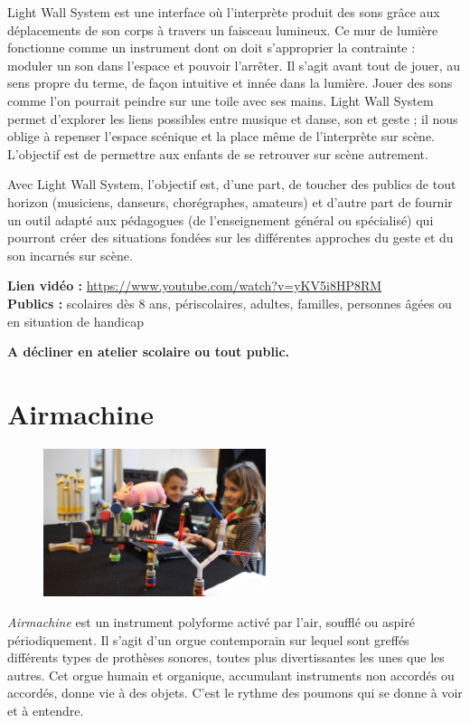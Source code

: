 \documentclass[fontsize=12pt]{scrartcl} %
\numberwithin{equation}{section} %
\numberwithin{table}{section} %
\begin{document}
Light Wall System est une interface où l'interprète produit des sons grâce aux déplacements de son corps à travers un faisceau lumineux. Ce mur de lumière fonctionne comme un instrument dont on doit s'approprier la contrainte : moduler un son dans l'espace et pouvoir l'arrêter. Il s'agit avant tout de jouer, au sens propre du terme, de façon intuitive et innée dans la lumière. Jouer des sons comme l'on pourrait peindre sur une toile avec ses mains. Light Wall System permet d'explorer les liens possibles entre musique et danse, son et geste ; il nous oblige à repenser l'espace scénique et la place même de l'interprète sur scène. L'objectif est de permettre aux enfants de se retrouver sur scène autrement.

Avec Light Wall System, l'objectif est, d'une part, de toucher des publics de tout horizon (musiciens, danseurs, chorégraphes, amateurs) et d'autre part de fournir un outil adapté aux pédagogues (de l'enseignement général ou spécialisé) qui pourront créer des situations fondées sur les différentes approches du geste et du son incarnés sur scène.

\noindent
\textbf{Lien vidéo :} \url{https://www.youtube.com/watch?v=yKV5i8HP8RM}\\

\noindent
\textbf{Publics :} scolaires dès 8 ans, périscolaires, adultes, familles, personnes âgées ou en situation de handicap

\noindent
\textbf{A décliner en atelier scolaire ou tout public.}

\pagebreak

\section{Airmachine}
\label{app:airmachine}

\begin{figure}
\centering
\includegraphics[width=6.5cm]{img/airmachine}
\label{fig:airmachine}
\end{figure}

\textit{Airmachine} est un instrument polyforme activé par l'air, soufflé ou aspiré périodiquement. Il s'agit d'un orgue contemporain sur lequel sont greffés différents types de prothèses sonores, toutes plus divertissantes les unes que les autres. Cet orgue humain et organique, accumulant instruments non accordés ou accordés, donne vie à des objets. C'est le rythme des poumons qui se donne à voir et à entendre.
\end{document}
